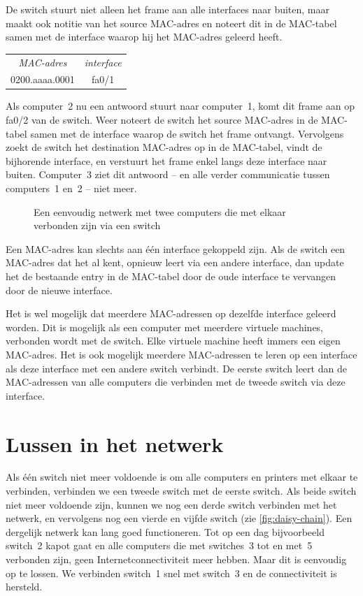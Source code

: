 De switch stuurt niet alleen het frame aan alle interfaces naar buiten, maar maakt ook notitie van het source MAC-adres en noteert dit in de MAC-tabel samen met de interface waarop hij het MAC-adres geleerd heeft.
\begin{center}
\begin{tabular}{cc}
\textit{MAC-adres} & \textit{interface} \\[1ex]
0200.aaaa.0001 & fa0/1\\
\end{tabular}
\end{center}
Als computer~2 nu een antwoord stuurt naar computer~1, komt dit frame aan op fa0/2 van de switch.
Weer noteert de switch het source MAC-adres in de MAC-tabel samen met de interface waarop de switch het frame ontvangt.
Vervolgens zoekt de switch het destination MAC-adres op in de MAC-tabel, vindt de bijhorende interface, en verstuurt het frame enkel langs deze interface naar buiten.
Computer~3 ziet dit antwoord -- en alle verder communicatie tussen computers~1 en~2 -- niet meer.

\begin{figure}
    \centering
    
    \caption{Een eenvoudig netwerk met twee computers die met elkaar verbonden zijn via een switch}
    \label{fig:simple-lan}
\end{figure}

Een MAC-adres kan slechts aan één interface gekoppeld zijn.
Als de switch een MAC-adres dat het al kent, opnieuw leert via een andere interface, dan update het de bestaande entry in de MAC-tabel door de oude interface te vervangen door de nieuwe interface.

Het is wel mogelijk dat meerdere MAC-adressen op dezelfde interface geleerd worden.
Dit is mogelijk als een computer met meerdere virtuele machines, verbonden wordt met de switch.
Elke virtuele machine heeft immers een eigen MAC-adres.
Het is ook mogelijk meerdere MAC-adressen te leren op een interface als deze interface met een andere switch verbindt.
De eerste switch leert dan de MAC-adressen van alle computers die verbinden met de tweede switch via deze interface.


\section{Lussen in het netwerk}
\label{sec:stp}

Als één switch niet meer voldoende is om alle computers en printers met elkaar te verbinden, verbinden we een tweede switch met de eerste switch.
Als beide switch niet meer voldoende zijn, kunnen we nog een derde switch verbinden met het netwerk, en vervolgens nog een vierde en vijfde switch (zie \vref{fig:daisy-chain}).
Een dergelijk netwerk kan lang goed functioneren.
Tot op een dag bijvoorbeeld switch~2 kapot gaat en alle computers die met switches~3 tot en met~5 verbonden zijn, geen Internetconnectiviteit meer hebben.
Maar dit is eenvoudig op te lossen.
We verbinden switch~1 snel met switch~3 en de connectiviteit is hersteld.



